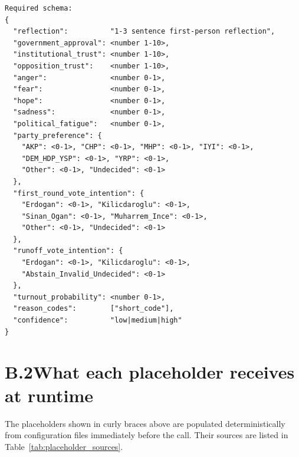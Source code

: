 \documentclass[12pt,a4paper]{report}
\begin{document}
\begin{lstlisting}[basicstyle=\ttfamily\scriptsize,breaklines=true,frame=single,columns=fullflexible,xleftmargin=0.5em]
Required schema:
{
  "reflection":          "1-3 sentence first-person reflection",
  "government_approval": <number 1-10>,
  "institutional_trust": <number 1-10>,
  "opposition_trust":    <number 1-10>,
  "anger":               <number 0-1>,
  "fear":                <number 0-1>,
  "hope":                <number 0-1>,
  "sadness":             <number 0-1>,
  "political_fatigue":   <number 0-1>,
  "party_preference": {
    "AKP": <0-1>, "CHP": <0-1>, "MHP": <0-1>, "IYI": <0-1>,
    "DEM_HDP_YSP": <0-1>, "YRP": <0-1>,
    "Other": <0-1>, "Undecided": <0-1>
  },
  "first_round_vote_intention": {
    "Erdogan": <0-1>, "Kilicdaroglu": <0-1>,
    "Sinan_Ogan": <0-1>, "Muharrem_Ince": <0-1>,
    "Other": <0-1>, "Undecided": <0-1>
  },
  "runoff_vote_intention": {
    "Erdogan": <0-1>, "Kilicdaroglu": <0-1>,
    "Abstain_Invalid_Undecided": <0-1>
  },
  "turnout_probability": <number 0-1>,
  "reason_codes":        ["short_code"],
  "confidence":          "low|medium|high"
}
\end{lstlisting}

\section*{B.2\quad What each placeholder receives at runtime}

The placeholders shown in curly braces above are populated deterministically from configuration files immediately before the call. Their sources are listed in Table~\ref{tab:placeholder_sources}.
\end{document}
